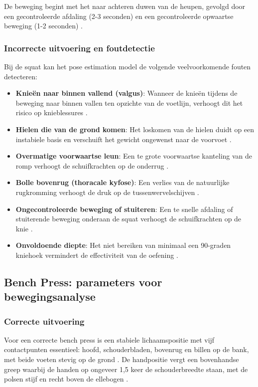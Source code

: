 De beweging begint met het naar achteren duwen van de heupen, gevolgd door een gecontroleerde afdaling (2-3 seconden) en een gecontroleerde opwaartse beweging (1-2 seconden) \autocite{CzaprowskiEtAl2012}.

\subsubsection{Incorrecte uitvoering en foutdetectie}
Bij de squat kan het pose estimation model de volgende veelvoorkomende fouten detecteren:

\begin{itemize}
    \item \textbf{Knieën naar binnen vallend (valgus)}: Wanneer de knieën tijdens de beweging naar binnen vallen ten opzichte van de voetlijn, verhoogt dit het risico op knieblessures \autocite{BengtssonEtAl2018}. 
    
    \item \textbf{Hielen die van de grond komen}: Het loskomen van de hielen duidt op een instabiele basis en verschuift het gewicht ongewenst naar de voorvoet \autocite{CzaprowskiEtAl2012}. 
    
    \item \textbf{Overmatige voorwaartse leun}: Een te grote voorwaartse kanteling van de romp verhoogt de schuifkrachten op de onderrug \autocite{BengtssonEtAl2018}. 
    
    \item \textbf{Bolle bovenrug (thoracale kyfose)}: Een verlies van de natuurlijke rugkromming verhoogt de druk op de tussenwervelschijven \autocite{CzaprowskiEtAl2012}. 
    
    \item \textbf{Ongecontroleerde beweging of stuiteren}: Een te snelle afdaling of stuiterende beweging onderaan de squat verhoogt de schuifkrachten op de knie \autocite{BengtssonEtAl2018}. 
    
    \item \textbf{Onvoldoende diepte}: Het niet bereiken van minimaal een 90-graden kniehoek vermindert de effectiviteit van de oefening \autocite{ComfortEtAl2018}. 
\end{itemize}

\subsection{Bench Press: parameters voor bewegingsanalyse}

\subsubsection{Correcte uitvoering}
Voor een correcte bench press is een stabiele lichaamspositie met vijf contactpunten essentieel: hoofd, schouderbladen, bovenrug en billen op de bank, met beide voeten stevig op de grond \autocite{KrolEtAl2010}. 
De handpositie vergt een bovenhandse greep waarbij de handen op ongeveer 1,5 keer de schouderbreedte staan, met de polsen stijf en recht boven de ellebogen \autocite{NoteboomEtAl2024}.

